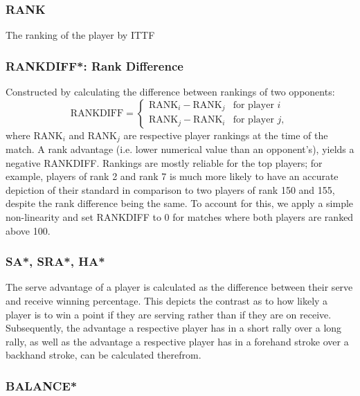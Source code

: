 \subsubsection*{RANK} \label{sec:rank}
The ranking of the player by ITTF 

\subsubsection*{RANKDIFF*: Rank Difference} \label{sec:rankdiff}
Constructed by calculating the difference between rankings of two opponents:
\begin{equation}
    \text{RANKDIFF} = \begin{cases}
\text{RANK}_i - \text{RANK}_j &\text{for player $i$} \\
\text{RANK}_j - \text{RANK}_i &\text{for player $j$},
\end{cases}
\end{equation}
where RANK$_i$ and RANK$_j$ are respective player rankings at the time of the match. A rank advantage (i.e. lower numerical value than an opponent's), yields a negative RANKDIFF. Rankings are mostly reliable for the top players; for example, players of rank 2 and rank 7 is much more likely to have an accurate depiction of their standard in comparison to two players of rank 150 and 155, despite the rank difference being the same. To account for this, we apply a simple non-linearity and set RANKDIFF to $0$ for matches where both players are ranked above 100.%


\subsubsection*{SA*, SRA*, HA*} \label{sec:advantage}
The serve advantage of a player is calculated as the difference between their serve and receive winning percentage. This depicts the contrast as to how likely a player is to win a point if they are serving rather than if they are on receive. Subsequently, the advantage a respective player has in a short rally over a long rally, as well as the advantage a respective player has in a forehand stroke over a backhand stroke, can be calculated therefrom.

\subsubsection*{BALANCE*} \label{sec:balance}

